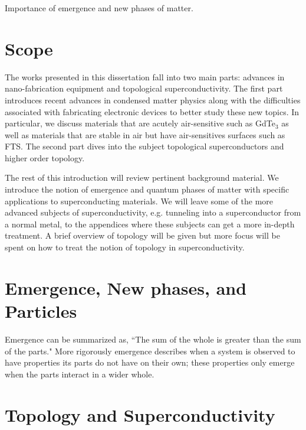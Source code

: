Importance of emergence and new phases of matter.
\section{Scope}
The works presented in this dissertation fall into two main parts: advances in nano-fabrication equipment and topological superconductivity. The first part introduces recent advances in condensed matter physics along with the difficulties associated with fabricating electronic devices to better study these new topics. In particular, we discuss materials that are acutely air-sensitive such as GdTe$_{3}$ as well as materials that are stable in air but have air-sensitives surfaces such as \ac{FTS}. The second part dives into the subject topological superconductors and higher order topology.\par
The rest of this introduction will review pertinent background material. We introduce the notion of emergence and quantum phases of matter with specific applications to superconducting materials. We will leave some of the more advanced subjects of superconductivity, e.g. tunneling into a superconductor from a normal metal, to the appendices where these subjects can get a more in-depth treatment. A brief overview of topology will be given but more focus will be spent on how to treat the notion of topology in superconductivity.
\section{Emergence, New phases, and Particles}
Emergence can be summarized as, ``The sum of the whole is greater than the sum of the parts." More rigorously emergence describes when a system is observed to have properties its parts do not have on their own; these properties only emerge when the parts interact in a wider whole. 
\section{Topology and Superconductivity}